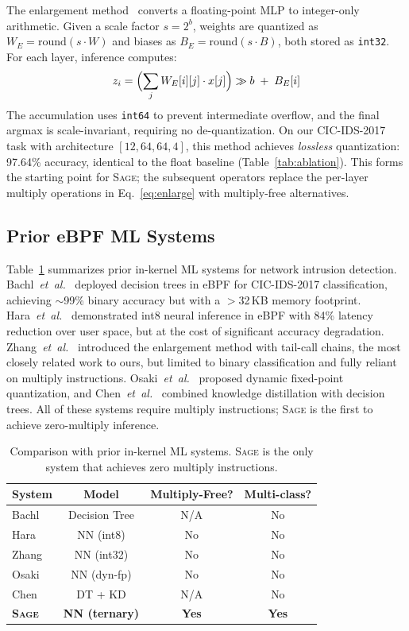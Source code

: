 \documentclass[sigconf,nonacm]{acmart}
\newcommand{\sys}{\textsc{Sage}\xspace}
\newcommand{\etal}{\textit{et~al.}\xspace}
\begin{document}
The enlargement method~\cite{zhang2024dsn} converts a floating-point MLP
to integer-only arithmetic.
Given a scale factor $s = 2^b$, weights are quantized as
$W_E = \text{round}(s \cdot W)$ and biases as
$B_E = \text{round}(s \cdot B)$, both stored as \texttt{int32}.
For each layer, inference computes:
\begin{equation}\label{eq:enlarge}
z_i = \Bigl(\sum_{j} W_E[i][j] \cdot x[j]\Bigr) \gg b \;+\; B_E[i]
\end{equation}
The accumulation uses \texttt{int64} to prevent intermediate overflow,
and the final argmax is scale-invariant, requiring no de-quantization.
On our CIC-IDS-2017 task with architecture $[12, 64, 64, 4]$, this
method achieves \emph{lossless} quantization: 97.64\% accuracy,
identical to the float baseline (Table~\ref{tab:ablation}).
This forms the starting point for \sys; the subsequent operators replace
the per-layer multiply operations in Eq.~\eqref{eq:enlarge} with
multiply-free alternatives.

\subsection{Prior eBPF ML Systems}

Table~\ref{tab:prior} summarizes prior in-kernel ML systems for network
intrusion detection.
Bachl~\etal~\cite{bachl2021dt} deployed decision trees in eBPF for
CIC-IDS-2017 classification, achieving ${\sim}$99\% binary accuracy but
with a $>$32\,KB memory footprint.
Hara~\etal~\cite{hara2023nn} demonstrated int8 neural inference in
eBPF with 84\% latency reduction over user space, but at the cost of
significant accuracy degradation.
Zhang~\etal~\cite{zhang2024dsn} introduced the enlargement method with
tail-call chains, the most closely related work to ours, but limited to
binary classification and fully reliant on multiply instructions.
Osaki~\etal~\cite{osaki2024} proposed dynamic fixed-point quantization,
and Chen~\etal~\cite{chen2025kd} combined knowledge distillation with
decision trees.
All of these systems require multiply instructions; \sys is the first
to achieve zero-multiply inference.

\begin{table}[t]
\centering
\caption{Comparison with prior in-kernel ML systems.
\sys is the only system that achieves zero multiply instructions.}
\label{tab:prior}
\small
\begin{tabular}{lccc}
\toprule
System & Model & Multiply-Free? & Multi-class? \\
\midrule
Bachl~\cite{bachl2021dt}  & Decision Tree & N/A & No \\
Hara~\cite{hara2023nn}    & NN (int8)     & No  & No \\
Zhang~\cite{zhang2024dsn} & NN (int32)    & No  & No \\
Osaki~\cite{osaki2024}    & NN (dyn-fp)   & No  & No \\
Chen~\cite{chen2025kd}    & DT + KD       & N/A & No \\
\textbf{\sys}              & \textbf{NN (ternary)} & \textbf{Yes} & \textbf{Yes} \\
\bottomrule
\end{tabular}
\end{table}
\end{document}
